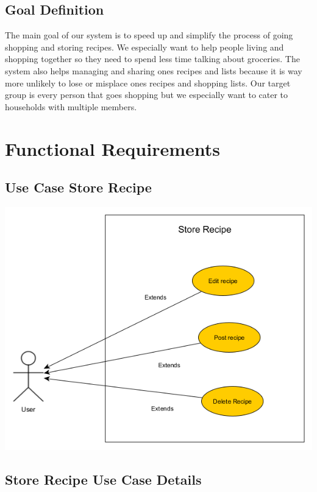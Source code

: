 \documentclass[12pt]{article}
\theoremstyle{definition}
\begin{document}
\subsection{Goal Definition}

The main goal of our system is to speed up and simplify the process of going shopping and storing recipes. We especially want to help people living and shopping together so they need to spend less time talking about groceries. The system also helps managing and sharing ones recipes and lists because it is way more unlikely to lose or misplace ones recipes and shopping lists.
Our target group is every person that goes shopping but we especially want to cater to households with multiple members.

\pagebreak

\section{Functional Requirements}

\subsection{Use Case Store Recipe}

\includegraphics[scale=.5]{Images/UseCaseStoreRecipe.png}\\

\subsection{Store Recipe Use Case Details}
\end{document}
